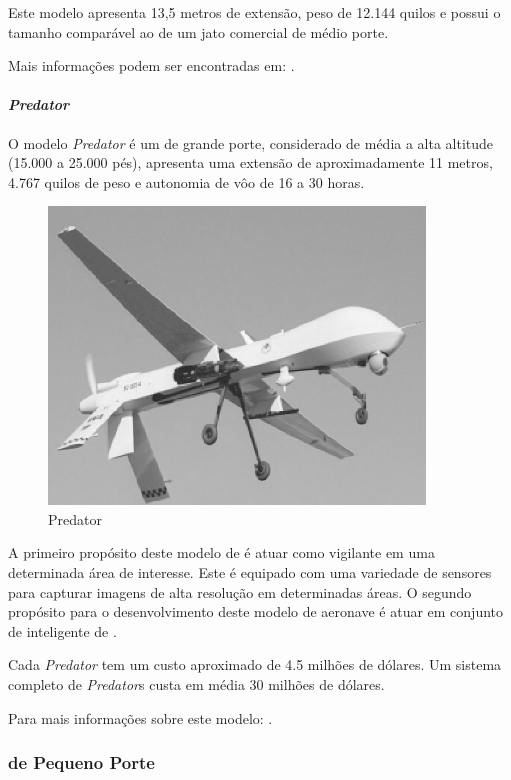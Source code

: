 Este modelo apresenta 13,5 metros de extensão, peso de 12.144 quilos e possui o tamanho comparável ao de um jato comercial de médio porte. 



Mais informações podem ser encontradas em:  \cite{Drew2005,uav_roadmap2005,Bone2003}.


\paragraph{ \emph{Predator} }

 O modelo \emph{Predator} é um \vant  de grande porte, considerado de média a alta altitude (15.000 a 25.000 pés), apresenta 
uma extensão de aproximadamente 11 metros,  4.767 quilos de peso e autonomia de vôo de 16 a 30 horas.

\begin{figure}[h!]
\centering
\includegraphics[width=10cm]{pictures/predator.png}
\caption{Predator}
 \label{fig:predator}
\end{figure}

A primeiro propósito deste modelo de \vant é atuar como vigilante em uma determinada área de interesse. Este \vant é equipado com uma variedade de sensores para capturar imagens de alta resolução em determinadas áreas.
O segundo propósito para o desenvolvimento deste modelo de aeronave é atuar em conjunto de inteligente de \uavs. 

Cada \emph{Predator} tem um custo aproximado de 4.5 milhões de dólares. Um sistema completo de \emph{Predator}s custa em média 30 milhões de dólares.

Para mais informações sobre este modelo:  \cite{Drew2005,uav_roadmap2005,Bone2003}.



\subsubsection{\vants de Pequeno Porte}

